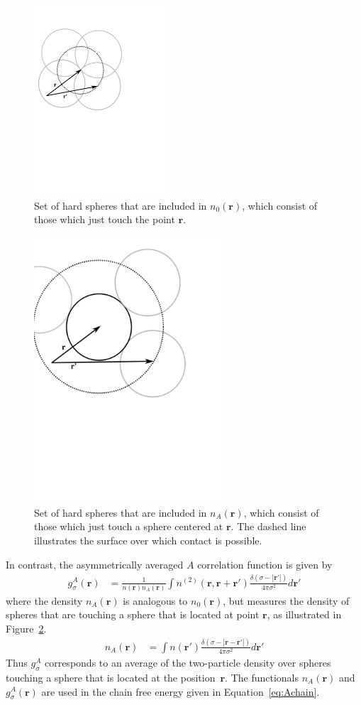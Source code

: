 \documentclass[letterpaper,twocolumn,amsmath,amssymb,pre]{revtex4-1}
\newcommand{\rr}{\textbf{r}}
\begin{document}
\begin{figure}
\includegraphics[width=5cm]{figs/n0}
\caption{Set of hard spheres that are included in $n_0(\mathbf{r})$, which
  consist of those which just touch the point $\mathbf{r}$.}
\label{fig:n0}
\end{figure}

\begin{figure}
\includegraphics[width=7cm]{figs/nA}
\caption{Set of hard spheres that are included in $n_A(\mathbf{r})$,
  which consist of those which just touch a sphere centered at
  $\mathbf{r}$.  The dashed line illustrates the surface over which
  contact is possible.}
\label{fig:nA}
\end{figure}

In contrast, the asymmetrically averaged $A$ correlation function is
given by
\begin{align}
  g^A_\sigma(\rr) &= \frac{1}{n(\rr)n_A(\rr)}
  \int n^{(2)}(\rr, \rr + \rr')
  \frac{\delta(\sigma -|\rr'|)}{4\pi\sigma^2}d\rr' \label{eq:gA}
\end{align}
where the density $n_A(\rr)$ is analogous to $n_0(\rr)$, but measures the
density of spheres that are touching a sphere that is located at
point $\rr$, as illustrated in Figure~\ref{fig:nA}.
\begin{align}
  n_A(\rr) &= \int n(\rr')
  \frac{\delta(\sigma -|\rr-\rr'|)}{4\pi\sigma^2} d\rr' \label{eq:nA}
\end{align}
Thus $g_\sigma^A$ corresponds to an average of the two-particle
density over spheres touching a sphere that is located at the
position~$\rr$.  The functionals $n_A(\rr)$ and $g_\sigma^A(\rr)$ are
used in the chain free energy given in Equation~\ref{eq:Achain}.
\end{document}
